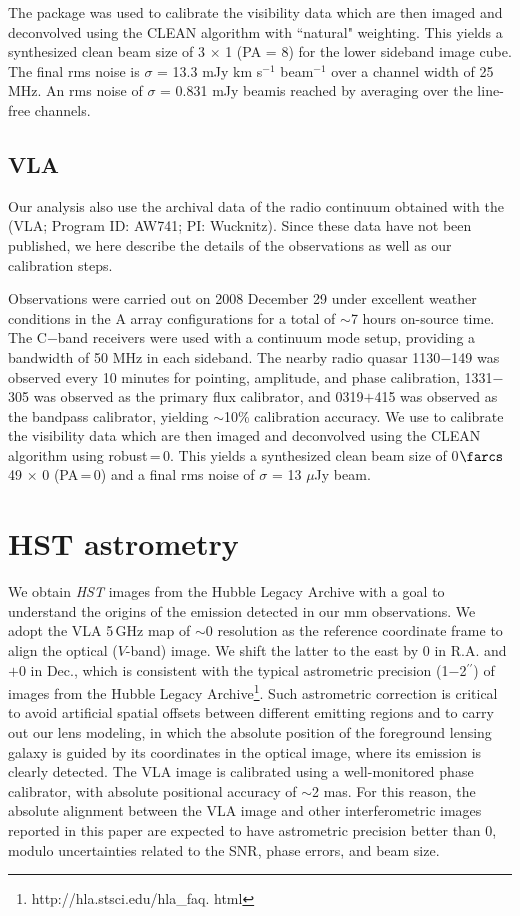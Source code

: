 \documentclass[]{emulateapj}
\begin{document}
The  package was used to calibrate the visibility data which are
then imaged and deconvolved using the CLEAN algorithm with ``natural" weighting. This yields a synthesized clean
beam size of 3 $\times$ 1 (PA = 8\degr) for the lower sideband
image cube. The final rms noise is $\sigma$ = 13.3 mJy km s$^{-1}$ beam$^{-1}$
over a channel width of 25 MHz. An rms noise of
$\sigma$ = 0.831 mJy beam\pmOne is reached by averaging over the
line-free channels.

\subsection{VLA} %
Our analysis also use the archival data of the radio continuum obtained with the \vla (VLA; Program ID: AW741; PI: Wucknitz). Since these data have not been
published, we here describe the details of the observations as well as our calibration steps.

Observations were carried out on 2008 December 29 under excellent weather
conditions in the A array configurations for a total of $\sim$7 hours on-source time. The C$-$band receivers were used with a continuum mode setup,
providing a bandwidth of 50 MHz in each sideband.
The nearby radio quasar 1130$-$149 was observed every 10 minutes for
pointing, amplitude, and phase calibration, 1331$-$305 was observed as the
primary flux calibrator, and 0319$+$415 was observed as the bandpass
calibrator, yielding $\sim$10\% calibration accuracy.
We use  to calibrate the visibility data which
are then imaged and deconvolved using
the CLEAN algorithm using robust\,=\,0. This yields a synthesized clean
beam size of 0$\farcs$49 $\times$ 0 (PA\,=\,0) and a final
rms noise of $\sigma$ = 13 $\mu$Jy beam\pmOne.


\section{HST astrometry} %
We obtain {\it HST} images from the Hubble Legacy Archive with
a goal to understand the origins of the emission detected
in our mm observations. We adopt the VLA 5\,GHz map of $\sim$0
resolution as the reference coordinate frame to align the optical ($V$-band) image.
We shift the latter to the east by 0 in R.A. and $+$0 in
Dec., which is consistent with the typical astrometric precision (1$-$2$^{\prime\prime}$) of
images from the Hubble Legacy Archive\footnote{http://hla.stsci.edu/hla\_faq.
html}. Such astrometric correction is critical to avoid artificial spatial
offsets between different emitting regions and to carry out our lens modeling,
in which the absolute position of the foreground lensing galaxy is guided by its
coordinates in the optical image, where its emission is clearly detected.
The VLA image is calibrated using a well-monitored phase
calibrator, with absolute positional accuracy of $\sim$2 mas.
For this reason, the absolute alignment between the VLA image and other
interferometric images reported in this paper are expected to have astrometric
precision better than 0, modulo uncertainties related to the SNR, phase
errors, and beam size.
\end{document}
